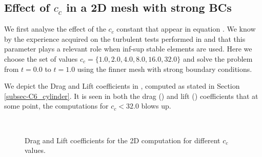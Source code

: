 \subsection{Effect of $ c_c $ in a 2D mesh with strong BCs}
We first analyse the effect of the $ c_c $ constant that appear in equation . We know by the experience acquired on the turbulent tests performed in  and  that this parameter plays a relevant role when inf-sup stable elements are used. Here we choose the set of values $ c_c = \{1.0,2.0,4.0,8.0,16.0,32.0\} $ and solve the problem from $ t=0.0 $ to $ t=1.0 $ using the finner mesh with strong boundary conditions.

We depict the Drag and Lift coefficients in , computed as stated in Section \ref{subsec-C6_cylinder}. It is seen in both the drag () and lift () coefficients that at some point, the computations for $ c_c<32.0 $ blows up.
\begin{figure}[h!]
  \centering
  \\
  \caption{Drag and Lift coefficients for the 2D computation for different $ c_c $ values.}
  \label{fig-NACA_c_c_drag_lift}
\end{figure}
